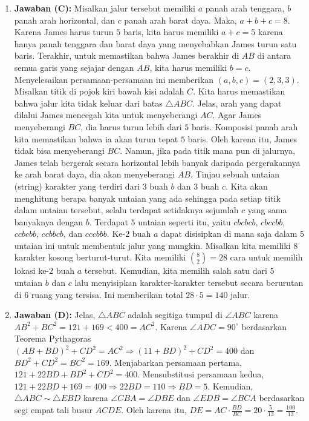 \documentclass{article}
\begin{document}
\begin{enumerate}
\item \textbf{Jawaban (C):} Misalkan jalur tersebut memiliki $a$ panah arah tenggara, $b$ panah arah horizontal, dan $c$ panah arah barat daya. Maka, $a+b+c=8$. Karena James harus turun $5$ baris, kita harus memiliki $a+c=5$ karena hanya panah tenggara dan barat daya yang menyebabkan James turun satu baris. Terakhir, untuk memastikan bahwa James berakhir di $AB$ di antara semua garis yang sejajar dengan $AB$, kita harus memiliki $b=c$. Menyelesaikan persamaan-persamaan ini memberikan $(a,b,c)=(2,3,3)$. Misalkan titik di pojok kiri bawah kisi adalah $C$. Kita harus memastikan bahwa jalur kita tidak keluar dari batas $\triangle ABC$. Jelas, arah yang dapat dilalui James mencegah kita untuk menyeberangi $AC$. Agar James menyeberangi $BC$, dia harus turun lebih dari $5$ baris. Komposisi panah arah kita memastikan bahwa ia akan turun tepat $5$ baris. Oleh karena itu, James tidak bisa menyeberangi $BC$. Namun, jika pada titik mana pun di jalurnya, James telah bergerak secara horizontal lebih banyak daripada pergerakannya ke arah barat daya, dia akan menyeberangi $AB$. Tinjau sebuah untaian (string) karakter yang terdiri dari $3$ buah $b$ dan $3$ buah $c$. Kita akan menghitung berapa banyak untaian yang ada sehingga pada setiap titik dalam untaian tersebut, selalu terdapat setidaknya sejumlah $c$ yang sama banyaknya dengan $b$. Terdapat $5$ untaian seperti itu, yaitu $cbcbcb$, $cbccbb$, $ccbcbb$, $ccbbcb$, dan $cccbbb$. Ke-$2$ buah $a$ dapat disisipkan di mana saja dalam $5$ untaian ini untuk membentuk jalur yang mungkin. Misalkan kita memiliki $8$ karakter kosong berturut-turut. Kita memiliki $\binom{8}{2}=28$ cara untuk memilih lokasi ke-$2$ buah $a$ tersebut. Kemudian, kita memilih salah satu dari $5$ untaian $b$ dan $c$ lalu menyisipkan karakter-karakter tersebut secara berurutan di $6$ ruang yang tersisa. Ini memberikan total $28\cdot5=140$ jalur.

\item \textbf{Jawaban (D):} Jelas, $\triangle ABC$ adalah segitiga tumpul di $\angle ABC$ karena $AB^{2}+BC^{2}=121+169<400=AC^{2}$. Karena $\angle ADC=90^{\circ}$ berdasarkan Teorema Pythagoras $(AB+BD)^{2}+CD^{2}=AC^{2}\Rightarrow(11+BD)^{2}+CD^{2}=400$ dan $BD^{2}+CD^{2}=BC^{2}=169$. Menjabarkan persamaan pertama, $121+22BD+BD^{2}+CD^{2}=400$. Mensubstitusi persamaan kedua, $121+22BD+169=400\Rightarrow22BD=110\Rightarrow BD=5$. Kemudian, $\triangle ABC \sim \triangle EBD$ karena $\angle CBA=\angle DBE$ dan $\angle EDB=\angle BCA$ berdasarkan segi empat tali busur $ACDE$. Oleh karena itu, $DE=AC\cdot\frac{BD}{BC}=20\cdot\frac{5}{13}=\frac{100}{13}$.


\end{enumerate}
\end{document}
